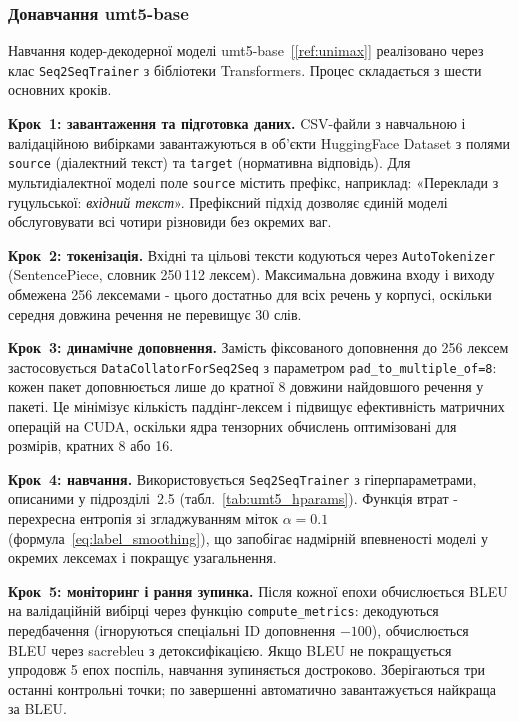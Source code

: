 \documentclass[14pt]{extarticle}
\newcommand{\citeref}[1]{\hyperref[#1]{[\ref*{#1}]}}
\begin{document}
\subsubsection{Донавчання umt5-base}

Навчання кодер-декодерної моделі umt5-base~\citeref{ref:unimax} реалізовано через клас \texttt{Seq2SeqTrainer} з бібліотеки Transformers. Процес складається з шести основних кроків.

\textbf{Крок~1: завантаження та підготовка даних.} CSV-файли з навчальною і валідаційною вибірками завантажуються в об'єкти HuggingFace Dataset з полями \texttt{source} (діалектний текст) та \texttt{target} (нормативна відповідь). Для мультидіалектної моделі поле \texttt{source} містить префікс, наприклад: «Переклади з гуцульської: \textit{вхідний текст}». Префіксний підхід дозволяє єдиній моделі обслуговувати всі чотири різновиди без окремих ваг.

\textbf{Крок~2: токенізація.} Вхідні та цільові тексти кодуються через \texttt{AutoTokenizer} (SentencePiece, словник 250\,112 лексем). Максимальна довжина входу і виходу обмежена 256 лексемами - цього достатньо для всіх речень у корпусі, оскільки середня довжина речення не перевищує 30 слів.

\textbf{Крок~3: динамічне доповнення.} Замість фіксованого доповнення до 256 лексем застосовується \texttt{DataCollatorForSeq2Seq} з параметром \texttt{pad\_to\_multiple\_of=8}: кожен пакет доповнюється лише до кратної 8 довжини найдовшого речення у пакеті. Це мінімізує кількість паддінг-лексем і підвищує ефективність матричних операцій на CUDA, оскільки ядра тензорних обчислень оптимізовані для розмірів, кратних 8 або 16.

\textbf{Крок~4: навчання.} Використовується \texttt{Seq2SeqTrainer} з гіперпараметрами, описаними у підрозділі~2.5 (табл.~\ref{tab:umt5_hparams}). Функція втрат - перехресна ентропія зі згладжуванням міток $\alpha=0.1$ (формула~\ref{eq:label_smoothing}), що запобігає надмірній впевненості моделі у окремих лексемах і покращує узагальнення.

\textbf{Крок~5: моніторинг і рання зупинка.} Після кожної епохи обчислюється BLEU на валідаційній вибірці через функцію \texttt{compute\_metrics}: декодуються передбачення (ігноруються спеціальні ID доповнення $-100$), обчислюється BLEU через sacrebleu з детоксифікацією. Якщо BLEU не покращується упродовж 5 епох поспіль, навчання зупиняється достроково. Зберігаються три останні контрольні точки; по завершенні автоматично завантажується найкраща за BLEU.
\end{document}
